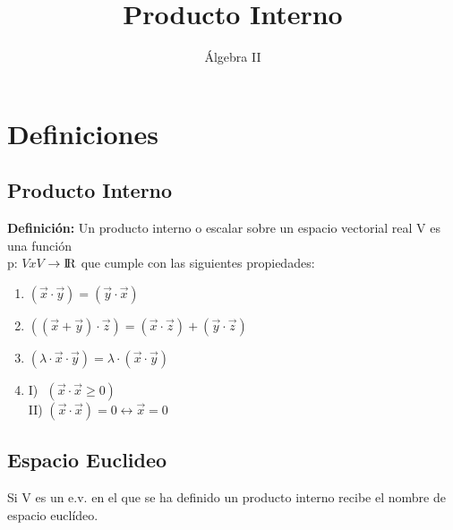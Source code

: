 \documentclass{article}
\title{Producto Interno}
\author{Álgebra II}
\date{\vspace{-5ex}}
\begin{document}
\maketitle{}
\section{Definiciones}
\subsection{Producto Interno}
\textbf{Definición:} Un producto interno o escalar sobre un espacio vectorial real V  es una función \\
p: $VxV$ $\rightarrow \rm I\!R $ que cumple con las siguientes propiedades:
\begin{enumerate}
\item $(\vec{x}\cdot\vec{y})=(\vec{y}\cdot\vec{x})$ 
\item $((\vec{x}+\vec{y})\cdot\vec{z})=(\vec{x}\cdot\vec{z})+(\vec{y}\cdot\vec{z})$
\item $(\lambda\cdot\vec{x}\cdot\vec{y}) = \lambda\cdot(\vec{x}\cdot\vec{y})$
\item I) $ $ $(\vec{x}\cdot\vec{x} \geq 0)$ \\ II) $(\vec{x}\cdot\vec{x}) = 0 \leftrightarrow \vec{x}=0 $
\end{enumerate}
\subsection{Espacio Euclideo}
Si V es un e.v. en el que se ha definido un producto interno recibe el nombre de espacio euclídeo. 
\end{document}
